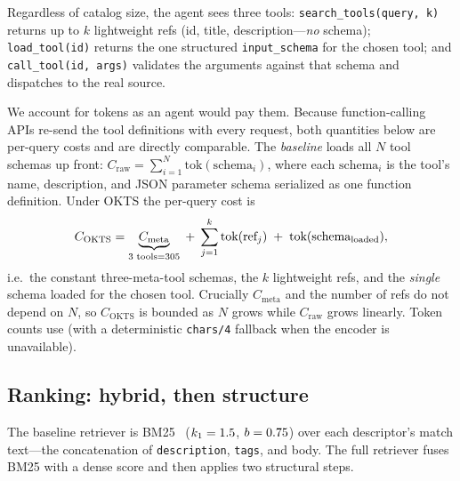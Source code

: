 \documentclass[11pt]{article}
\begin{document}
Regardless of catalog size, the agent sees three tools:
\texttt{search\_tools(query, k)} returns up to $k$ lightweight refs
(id, title, description---\emph{no} schema); \texttt{load\_tool(id)} returns the
one structured \texttt{input\_schema} for the chosen tool; and
\texttt{call\_tool(id, args)} validates the arguments against that schema and
dispatches to the real source.

We account for tokens as an agent would pay them. Because function-calling APIs
re-send the tool definitions with every request, both quantities below are
per-query costs and are directly comparable. The \emph{baseline} loads all
$N$ tool schemas up front:
$C_\text{raw} = \sum_{i=1}^{N} \text{tok}(\text{schema}_i)$, where each
$\text{schema}_i$ is the tool's name, description, and JSON parameter schema
serialized as one function definition.
Under OKTS the per-query cost is
\begin{equation}
C_\text{OKTS} = \underbrace{C_\text{meta}}_{\text{3 tools} = 305} \;+\;
\sum_{j=1}^{k}\text{tok}(\text{ref}_j) \;+\; \text{tok}(\text{schema}_{\text{loaded}}),
\label{eq:cost}
\end{equation}
i.e.\ the constant three-meta-tool schemas, the $k$ lightweight refs, and the
\emph{single} schema loaded for the chosen tool. Crucially $C_\text{meta}$ and
the number of refs do not depend on $N$, so $C_\text{OKTS}$ is bounded as $N$
grows while $C_\text{raw}$ grows linearly. Token counts use
\tokenizerName{} (with a deterministic \texttt{chars/4} fallback when the encoder
is unavailable).

\subsection{Ranking: hybrid, then structure}

The baseline retriever is BM25~\citep{robertson2009bm25}
($k_1=1.5$, $b=0.75$) over each descriptor's match text---the concatenation
of \texttt{description}, \texttt{tags}, and body. The full retriever fuses BM25
with a dense score and then applies two structural steps.
\end{document}
